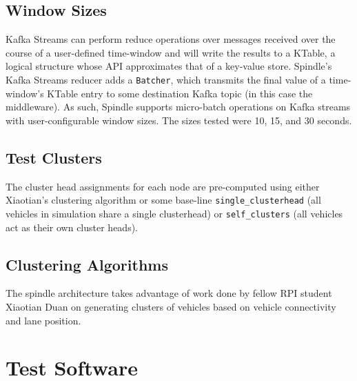 \documentclass{thesis}
\begin{document}
\subsection{Window Sizes}
    Kafka Streams can perform reduce operations over messages received over the course of a user-defined time-window
    and will write the results to a KTable, a logical structure whose API approximates that of a key-value store. %
    Spindle's Kafka Streams reducer adds a \verb|Batcher|, which transmits the final value of a time-window's KTable
    entry to some destination Kafka topic (in this case the middleware). As such, Spindle supports micro-batch operations
    on Kafka streams with user-configurable window sizes. The sizes tested were 10, 15, and 30 seconds.
\subsection{Test Clusters}
    The cluster head assignments for each node are pre-computed using either Xiaotian's %
    clustering algorithm or some base-line \verb|single_clusterhead| (all vehicles in simulation share a single clusterhead)
    or \verb|self_clusters| (all vehicles act as their own cluster heads).
\subsection{Clustering Algorithms}
    The spindle architecture takes advantage of work done by fellow RPI student Xiaotian Duan on generating
    clusters of vehicles based on vehicle connectivity and lane position. 

\section{Test Software}
\end{document}
